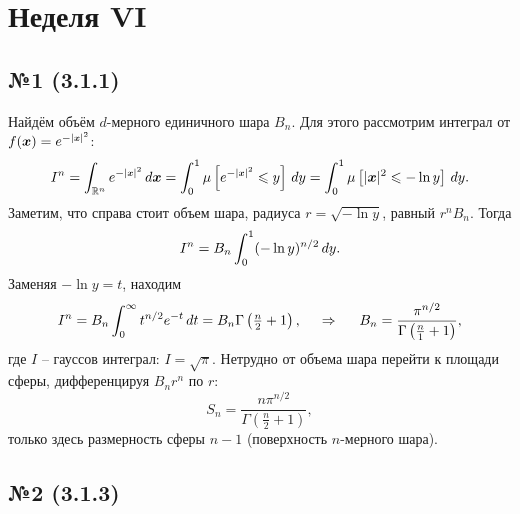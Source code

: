 \section{Неделя VI}





\subsection*{№1 (3.1.1)}

Найдём объём $d$-мерного единичного шара $B_n$. Для этого рассмотрим интеграл от $f(\vc{x}) = e^{-|\smallvc{x}|^2}$:
\begin{equation*}
    I^n = \int_{\mathbb{R}^n} e^{-|\smallvc{x}|^2} \d \vc{x} = \int_0^1 \mu\left[e^{-|\smallvc{x}|^2} \leq y\right] \d y = \int_{0}^{1} \mu\left[|\vc{x}|^2 \leq - \ln y\right] \d y.
\end{equation*}
Заметим, что справа стоит объем шара, радиуса $r = \sqrt{-\ln y}$, равный $r^{n} B_n$. Тогда
\begin{equation*}
    I^n = B_n \int_{0}^{1} (- \ln y)^{n/2} \, d y.  
\end{equation*}
Заменяя $- \ln y = t$, находим
\begin{equation*}
    I^n = B_n \int_{0}^{\infty} t^{n/2} e^{-t} \, d t = B_n \Gamma\left(\tfrac{n}{2}+1\right),
    \hspace{0.5cm} \Rightarrow \hspace{0.5cm}
    B_n = \frac{\pi^{n/2}}{\Gamma\left(\tfrac{n}{1}+1\right)},
\end{equation*}
где $I$ -- гауссов интеграл: $I = \sqrt{\pi}$. Нетрудно от объема шара перейти к площади сферы, дифференцируя $B_n r^n$ по $r$:
\begin{equation*}
    S_n = \frac{n \pi^{n/2}}{ \Gamma\left(\tfrac{n}{2}+1\right)},
\end{equation*}
только здесь размерность сферы $n-1$ (поверхность $n$-мерного шара). 




\subsection*{№2 (3.1.3)}


